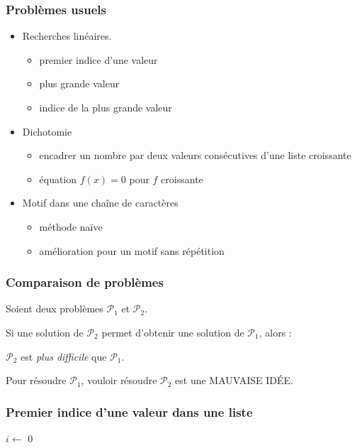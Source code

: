 


\begin{frame}
  \frametitle{Problèmes usuels}
  \begin{itemize}
    \item Recherches linéaires.
    \begin{itemize}
      \item premier indice d'une valeur
      \item plus grande valeur
      \item indice de la plus grande valeur
    \end{itemize}
    \item Dichotomie
    \begin{itemize}
      \item encadrer un nombre par deux valeurs consécutives d'une liste croissante
      \item équation $f(x)=0$ pour $f$ croissante
    \end{itemize}
    \item Motif dans une chaîne de caractères
    \begin{itemize}
      \item méthode naïve
      \item amélioration pour un motif sans répétition
    \end{itemize}

  \end{itemize}

\end{frame}

\begin{frame}
  \frametitle{Comparaison de problèmes}
  \begin{center}
Soient deux problèmes $\mathcal{P}_1$ et $\mathcal{P}_2$.

\bigskip
Si une solution de $\mathcal{P}_2$ permet d'obtenir une solution de $\mathcal{P}_1$, alors :

\bigskip
 $\mathcal{P}_2$ est \emph{plus difficile} que $\mathcal{P}_1$. 
     
  \end{center}

Pour résoudre $\mathcal{P}_1$,  vouloir résoudre $\mathcal{P}_2$ est une MAUVAISE ID\'EE.
\end{frame}

\begin{frame}
  \frametitle{Premier indice d'une valeur dans une liste}
\begin{algorithm}[H]
  $i\leftarrow$ 0 \;
  \caption{}
\end{algorithm}
\end{frame}

